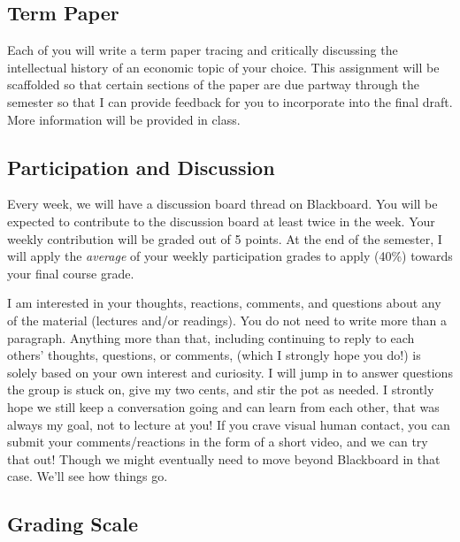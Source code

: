 \documentclass{article}
\begin{document}
\hypertarget{term-paper}{%
\subsection*{Term Paper}\label{term-paper}}

Each of you will write a term paper tracing and critically discussing
the intellectual history of an economic topic of your choice. This
assignment will be scaffolded so that certain sections of the paper are
due partway through the semester so that I can provide feedback for you
to incorporate into the final draft. More information will be provided
in class.

\hypertarget{participation-and-discussion}{%
\subsection*{Participation and
Discussion}\label{participation-and-discussion}}

Every week, we will have a discussion board thread on Blackboard. You
will be expected to contribute to the discussion board at least twice in
the week. Your weekly contribution will be graded out of 5 points. At
the end of the semester, I will apply the \emph{average} of your weekly
participation grades to apply (40\%) towards your final course grade.

I am interested in your thoughts, reactions, comments, and questions
about any of the material (lectures and/or readings). You do not need to
write more than a paragraph. Anything more than that, including
continuing to reply to each others' thoughts, questions, or comments,
(which I strongly hope you do!) is solely based on your own interest and
curiosity. I will jump in to answer questions the group is stuck on,
give my two cents, and stir the pot as needed. I strontly hope we still
keep a conversation going and can learn from each other, that was always
my goal, not to lecture at you! If you crave visual human contact, you
can submit your comments/reactions in the form of a short video, and we
can try that out! Though we might eventually need to move beyond
Blackboard in that case. We'll see how things go.

\hypertarget{grading-scale}{%
\subsection*{Grading Scale}\label{grading-scale}}
\end{document}
